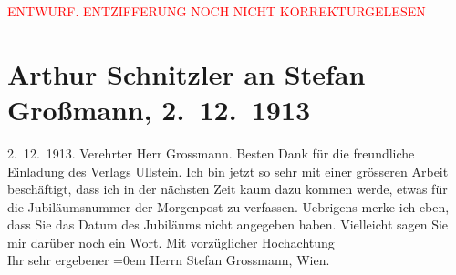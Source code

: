 
\begin{center}
            \textcolor{red}{ENTWURF. ENTZIFFERUNG NOCH NICHT KORREKTURGELESEN}
                      \end{center}
            
               \section[Arthur Schnitzler an Stefan Großmann, 2. 12. 1913]{ Arthur Schnitzler an Stefan Großmann, 2. 12. 1913}\nopagebreak{}\rehead{ }\begin{ledgroupsized}[t]{13cm}\normalsize\beginnumbering{} \toendnotes[C]{\smallbreak\pagebreak[2]} 
\toendnotes[C]{\smallbreak}\pstart
           \raggedleft{}{\pb}2. 12. 1913.\pend
           \pstart\center{}Verehrter Herr Grossmann.\pend\pstart
           Besten Dank für die freundliche Einladung des Verlags Ullstein. Ich bin jetzt so sehr mit einer grösseren Arbeit beschäftigt, dass
                    ich in der nächsten Zeit kaum dazu kommen werde, etwas für die Jubiläumsnummer
                    der Morgenpost zu verfassen. Uebrigens merke
                    ich eben, dass Sie das Datum des Jubiläums nicht angegeben haben. Vielleicht
                    sagen Sie mir darüber noch ein Wort.\pend
           \pstart
           Mit vorzüglicher Hochachtung{\\[\baselineskip]}Ihr sehr ergebener\pend
           \leftskip=0em{}{\bigskip}\pstart
           \noindent{}Herrn Stefan Grossmann, Wien.\pend
           \endnumbering{}\end{ledgroupsized}  \newcommand{\dateiname}{L02159}\newcommand{\titel}{Arthur Schnitzler an Stefan Großmann, 2. 12. 1913}\newcommand{\editorInnen}{Martin Anton Müller und Gerd-Hermann Susen}
      